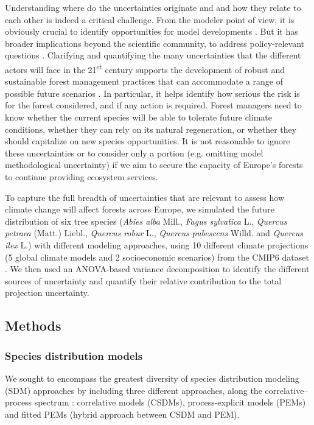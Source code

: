 \documentclass[letterpaper,8pt]{article}  %
\begin{document}
\begin{doublespacing}
\begin{linenumbers}
Understanding where do the uncertainties originate and  and how they relate to each other is indeed a critical challenge. From the modeler point of view, it is obviously crucial to identify opportunities for model developments \citep{Petchey2015}. But it has broader implications beyond the scientific community, to address policy-relevant questions \citep{Urban2016}. Clarifying and quantifying the many uncertainties that the different actors will face in the 21\textsuperscript{st} century supports the development of robust and sustainable forest management practices that can accommodate a range of possible future scenarios \citep{IPCC2021}. In particular, it helps identify how serious the risk is for the forest considered, and if any action is required. Forest managers need to know whether the current species will be able to tolerate future climate conditions, whether they can rely on its natural regeneration, or whether they should capitalize on new species opportunities. It is not reasonable to ignore these uncertainties or to consider only a portion (e.g. omitting model methodological uncertainty) if we aim to secure the capacity of Europe’s forests to continue providing ecosystem services. 

To capture the full breadth of uncertainties that are relevant to assess how climate change will affect forests across Europe,
we simulated the future distribution of six tree species (\emph{Abies alba} Mill., \emph{Fagus sylvatica} L., \emph{Quercus petraea} (Matt.) Liebl., \emph{Quercus robur} L., \emph{Quercus pubescens} Willd. and \emph{Quercus ilex} L.) with different modeling approaches, using 10 different climate projections (5 global climate models and 2 socioeconomic scenarios) from the CMIP6 dataset \citep{Noel2022}. We then used an ANOVA-based variance decomposition to identify the different sources of uncertainty and quantify their relative contribution to the total projection uncertainty.


\subsection{Methods}

\subsubsection{Species distribution models}

We sought to encompass the greatest diversity of species distribution modeling (SDM) approaches by including three different approaches, along the correlative–process spectrum \citep{Dormann2012}: correlative models (CSDMs), process-explicit models (PEMs) and fitted PEMs (hybrid approach between CSDM and PEM).


\end{linenumbers}
\end{doublespacing}
\end{document}
